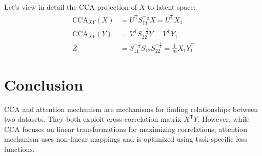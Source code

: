 \documentclass[a4paper,14pt]{article}
\newcommand{\T}{^{\mathsf{T}}}
\theoremstyle{plain} %
\theoremstyle{definition} %
\theoremstyle{remark} %
\begin{document}
	Let's view in detail the CCA projection of $X$ to latent space:
	\begin{equation}
		\begin{aligned}
			\text{CCA}_{XY}(X) &= U\T S_{11}^{-\frac{1}{2}}X = U\T X_1 \\
			\text{CCA}_{XY}(Y) &= V\T S_{22}^{-\frac{1}{2}}Y = V\T Y_1 \\
			Z &= S_{11}^{- \frac{1}{2}} S_{12} S_{22}^{- \frac{1}{2}} = \frac{1}{m} X_1 Y_1\T
		\end{aligned}
	\end{equation}

	\section*{Conclusion}
	CCA and attention mechanism are mechanisms for finding relationships between two datasets. They both exploit cross-correlation matrix $X\T Y$. However, while CCA focuses on linear transformations for maximizing correlations, attention mechanism uses non-linear mappings and is optimized using task-specific loss functions.
	
	
\end{document}

